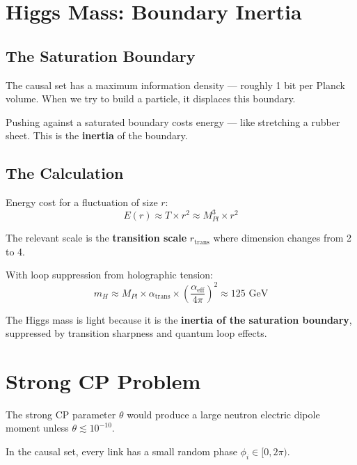 \documentclass[11pt, a4paper, openany]{book}
\begin{document}
\section{Higgs Mass: Boundary Inertia}

\subsection{The Saturation Boundary}

The causal set has a maximum information density --- roughly 1 bit per Planck volume.
When we try to build a particle, it displaces this boundary.

Pushing against a saturated boundary costs energy --- like stretching a rubber sheet.
This is the \textbf{inertia} of the boundary.

\subsection{The Calculation}

Energy cost for a fluctuation of size $r$:
\begin{equation}
E(r) \approx T \times r^2 \approx M_{Pl}^3 \times r^2
\end{equation}

The relevant scale is the \textbf{transition scale} $r_{\text{trans}}$ where dimension changes from 2 to 4.

With loop suppression from holographic tension:
\begin{equation}
m_H \approx M_{Pl} \times \alpha_{\text{trans}} \times \left(\frac{\alpha_{\text{eff}}}{4\pi}\right)^2 \approx 125 \text{ GeV}
\end{equation}

\begin{result}
The Higgs mass is light because it is the \textbf{inertia of the saturation boundary}, suppressed by transition sharpness and quantum loop effects.
\end{result}

\section{Strong CP Problem}

The strong CP parameter $\theta$ would produce a large neutron electric dipole moment unless $\theta \lesssim 10^{-10}$.

In the causal set, every link has a small random phase $\phi_i \in [0, 2\pi)$.
\end{document}
